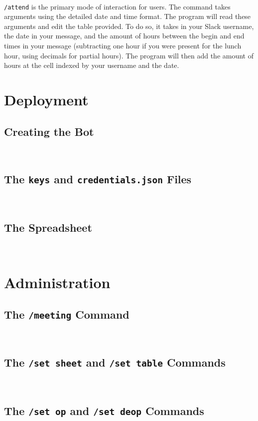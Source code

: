 \documentclass{article}
\begin{document}
\

\texttt{/attend} is the primary mode of interaction for users. The command takes arguments using the detailed date and time format. The program will read these arguments and edit the table provided. To do so, it takes in your Slack username, the date in your message, and the amount of hours between the begin and end times in your message (subtracting one hour if you were present for the lunch hour, using decimals for partial hours). The program will then add the amount of hours at the cell indexed by your username and the date.

\section{Deployment}

\subsection{Creating the Bot}

\

\subsection{The \texttt{keys} and \texttt{credentials.json} Files}

\

\subsection{The Spreadsheet}

\

\section{Administration}

\subsection{The \texttt{/meeting} Command}

\

\subsection{The \texttt{/set sheet} and \texttt{/set table} Commands}

\

\subsection{The \texttt{/set op} and \texttt{/set deop} Commands}

\
\end{document}
